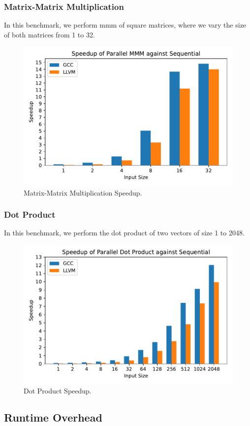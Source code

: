 \subsubsection{Matrix-Matrix Multiplication}

In this benchmark, we perform \gls{mmm} of square matrices, where we vary the
size of both matrices from 1 to 32.

\begin{figure}[h]
	\centering
	\includegraphics[width=.59\linewidth]{./fig/benchmarks/mm_speedup.pdf}
	\caption{Matrix-Matrix Multiplication Speedup.}%
	\label{fig:mm-speedup}
\end{figure}

\subsubsection{Dot Product}

In this benchmark, we perform the dot product of two vectors of size 1 to 2048.

\begin{figure}[h]
	\centering
	\includegraphics[width=.59\linewidth]{./fig/benchmarks/dotp_speedup.pdf}
	\caption{Dot Product Speedup.}%
	\label{fig:dotp-speedup}
\end{figure}

\subsection{Runtime Overhead}
\label{subsec:runtime-overhead}


